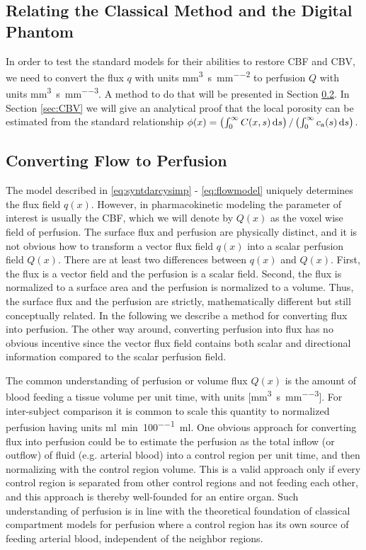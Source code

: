 \documentclass[paper=a4, fontsize=11pt,parskip=half,headings=small]{scrartcl}
\newcommand{\ca}{c_\mathrm{a}}
\newcommand{\Perf}{Q}
\newcommand{\siQmm}{\milli\meter\cubed\per\second\per\milli\meter\cubed}
\newcommand{\siPml}{\milli\litre\per\minute\per100\milli\litre}
\newcommand{\siq}{\milli\meter\cubed\per\second\per\milli\meter\squared}
\begin{document}
	\subsection{Relating the Classical Method and the Digital Phantom}\label{sec:relation}
	
	In order to test the standard models for their abilities to restore CBF and CBV, we need to convert the flux $q$ with units \si{\siq} to perfusion $\Perf$ with units \si{\siQmm}. 
	A method to do that will be presented in Section \ref{sec:flux2perf}.
	In Section \ref{sec:CBV} we will give an analytical proof that the local porosity can be estimated from the standard relationship $\phi(x) = \left(\int_0^\infty C(x,s) \diffint s\right)/\left(\int_0^\infty \ca(s) \diffint s\right)$.
	
	
	
	\subsection{Converting Flow to Perfusion}\label{sec:flux2perf}
	The model described in \eqref{eq:syntdarcysimp} - \eqref{eq:flowmodel} uniquely determines the flux field $q(x)$. 
	However, in pharmacokinetic modeling the parameter of interest is usually the CBF, which we will denote by $\Perf (x)$ as the voxel wise field of perfusion. The surface flux and perfusion are physically distinct, and it is not obvious how to transform a vector flux field $q(x)$ into a scalar perfusion field $\Perf (x)$.
	There are at least two differences between $q(x)$ and $\Perf (x)$. 
	First, the flux is a vector field and the perfusion is a scalar field. 
	Second, the flux is normalized to a surface area and the perfusion is normalized to a volume. 
	Thus, the surface flux and the perfusion are strictly, mathematically different but still conceptually related. 
	In the following we describe a method for converting flux into perfusion. The other way around, converting perfusion into flux has no obvious incentive since the vector flux field contains both scalar and directional information compared to the scalar perfusion field.

	The common understanding of perfusion or volume flux $\Perf (x)$ is the amount of blood feeding a tissue volume per unit time, with units [\si{\siQmm}]. 
	For inter-subject comparison it is common to scale this quantity to normalized perfusion having units \si{\siPml}. 
	One obvious approach for converting flux into perfusion could be to estimate the perfusion as the total inflow (or outflow) of fluid (e.g. arterial blood) into a control region per unit time, and then normalizing with the control region volume. 
	This is a valid approach only if every control region is separated from other control regions and not feeding each other, and this approach is thereby well-founded 
	for an entire organ. 
	Such understanding of perfusion is in line with the theoretical foundation of classical compartment models for perfusion where a control region has its own source of feeding arterial blood, independent of the neighbor regions. 
	
\end{document}
